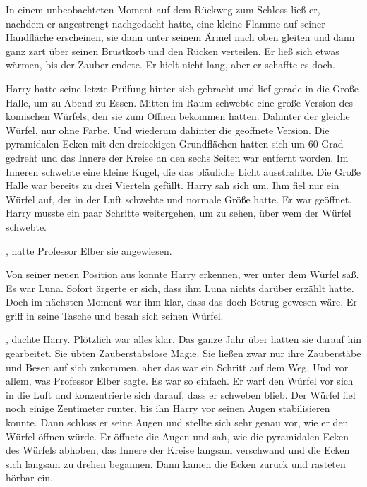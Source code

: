 


In einem unbeobachteten Moment auf dem Rückweg zum Schloss ließ er, nachdem er angestrengt nachgedacht hatte, eine kleine Flamme auf seiner Handfläche erscheinen, sie dann unter seinem Ärmel nach oben gleiten und dann ganz zart über seinen Brustkorb und den Rücken verteilen. Er ließ sich etwas wärmen, bis der Zauber endete. Er hielt nicht lang, aber er schaffte es doch.

\trenn

Harry hatte seine letzte Prüfung hinter sich gebracht und lief gerade in die Große Halle, um zu Abend zu Essen. Mitten im Raum schwebte eine große Version des komischen Würfels, den sie zum Öffnen bekommen hatten. Dahinter der gleiche Würfel, nur ohne Farbe. Und wiederum dahinter die geöffnete Version. Die pyramidalen Ecken mit den dreieckigen Grundflächen hatten sich um 60 Grad gedreht und das Innere der Kreise an den sechs Seiten war entfernt worden. Im Inneren schwebte eine kleine Kugel, die das bläuliche Licht ausstrahlte. Die Große Halle war bereits zu drei Vierteln gefüllt. Harry sah sich um. Ihm fiel nur ein Würfel auf, der in der Luft schwebte und normale Größe hatte. Er war geöffnet. Harry musste ein paar Schritte weitergehen, um zu sehen, über wem der Würfel schwebte.

, hatte Professor Elber sie angewiesen.

Von seiner neuen Position aus konnte Harry erkennen, wer unter dem Würfel saß. Es war Luna. Sofort ärgerte er sich, dass ihm Luna nichts darüber erzählt hatte. Doch im nächsten Moment war ihm klar, dass das doch Betrug gewesen wäre. Er griff in seine Tasche und besah sich seinen Würfel.


, dachte Harry. Plötzlich war alles klar. Das ganze Jahr über hatten sie darauf hin gearbeitet. Sie übten Zauberstabslose Magie. Sie ließen zwar nur ihre Zauberstäbe und Besen auf sich zukommen, aber das war ein Schritt auf dem Weg. Und vor allem, was Professor Elber sagte.  Es war so einfach. Er warf den Würfel vor sich in die Luft und konzentrierte sich darauf, dass er schweben blieb. Der Würfel fiel noch einige Zentimeter runter, bis ihn Harry vor seinen Augen stabilisieren konnte. Dann schloss er seine Augen und stellte sich sehr genau vor, wie er den Würfel öffnen würde. Er öffnete die Augen und sah, wie die pyramidalen Ecken des Würfels abhoben, das Innere der Kreise langsam verschwand und die Ecken sich langsam zu drehen begannen. Dann kamen die Ecken zurück und rasteten hörbar ein.

